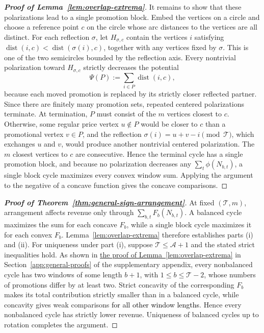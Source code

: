 \begin{proof}[\normalfont\bfseries Proof of Lemma~\ref{lem:overlap-extrema}]
            It remains to show that these polarizations lead to a single promotion block. Embed the vertices on a circle and choose a reference point \(c\) on the circle whose arc distances to the vertices are all distinct. For each reflection \(\sigma\), let \(H_{\sigma,c}\) contain the vertices \(i\) satisfying
            \(\operatorname{dist}(i,c)<\operatorname{dist}(\sigma(i),c)\), together with any vertices fixed by \(\sigma\). This is one of the two semicircles bounded by the reflection axis. Every nontrivial polarization toward \(H_{\sigma,c}\) strictly decreases the potential
            \[
                \Psi(P):=\sum_{i\in P}\operatorname{dist}(i,c),
            \]
            because each moved promotion is replaced by its strictly closer reflected partner. Since there are finitely many promotion sets, repeated centered polarizations terminate. At termination, \(P\) must consist of the \(m\) vertices closest to \(c\). Otherwise, some regular price vertex \(u\notin P\) would be closer to \(c\) than a promotional vertex \(v\in P\), and the reflection \(\sigma(i)=u+v-i\pmod \mathcal T\), which exchanges \(u\) and \(v\), would produce another nontrivial centered polarization. The \(m\) closest vertices to \(c\) are consecutive. Hence the terminal cycle has a single promotion block, and because no polarization decreases any \(\sum_t\phi(N_{b,t})\), a single block cycle maximizes every convex window sum. Applying the argument to the negative of a concave function gives the concave comparisons.
\end{proof}

\begingroup\color{black}
\label{app:arrangement-theorem-proof}
\begin{proof}[\normalfont\bfseries Proof of Theorem~\ref{thm:general-sign-arrangement}]
At fixed \((\mathcal T,m)\), arrangement affects revenue only through \(\sum_{b,t}F_b(N_{b,t})\). A balanced cycle maximizes the sum for each concave \(F_b\), while a single block cycle maximizes it for each convex \(F_b\). Lemma~\ref{lem:overlap-extrema} therefore establishes parts (i) and (ii). For uniqueness under part (i), suppose \(\mathcal T\le\mathcal A+1\) and the stated strict inequalities hold. As shown in \hyperref[app:overlap-proof]{the proof of Lemma~\ref*{lem:overlap-extrema}} in Section~\ref{app:general-proofs} of the supplementary appendix, every nonbalanced cycle has two windows of some length \(b+1\), with \(1\le b\le\mathcal T-2\), whose numbers of promotions differ by at least two. Strict concavity of the corresponding \(F_b\) makes its total contribution strictly smaller than in a balanced cycle, while concavity gives weak comparisons \textcolor{black}{for all other window lengths}. Hence every nonbalanced cycle has strictly lower revenue. Uniqueness of balanced cycles up to rotation completes the argument.
\end{proof}
\par\endgroup

